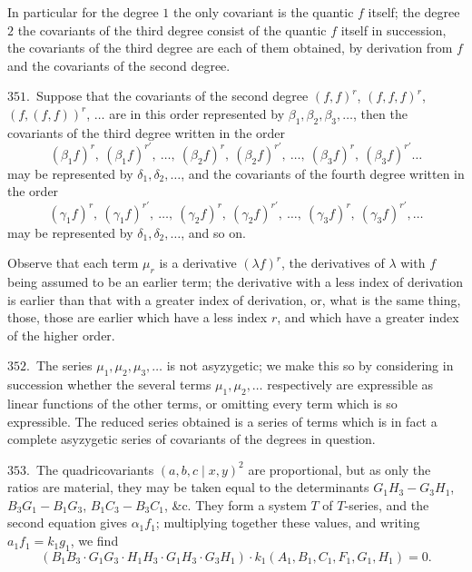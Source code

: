 \documentclass[11pt,a4paper]{article}
\providecommand{\midbar}{\mid}
\begin{document}
In particular for the degree $1$ the only covariant is the quantic $f$
itself; the degree $2$ the covariants of the third degree consist of the
quantic $f$ itself in succession, the covariants of the third degree are
each of them obtained, by derivation from $f$ and the covariants of the
second degree.

\noindent$351$.\ Suppose that the covariants of the second degree
$(f,f)^{r}$, $(f,f,f)^{r}$, $(f,(f,f))^{r}$, $\dotsc$ are
in this order represented by $\beta_{1}, \beta_{2}, \beta_{3}, \dotsc$,
then the covariants of the third degree written in the order
\[
(\beta_{1}f)^{r},\ (\beta_{1}f)^{r'},\ \dotsc,\ (\beta_{2}f)^{r},\
(\beta_{2}f)^{r'},\ \dotsc,\ (\beta_{3}f)^{r},\ (\beta_{3}f)^{r'}\dotsc
\]
may be represented by $\delta_{1},\delta_{2},\dotsc$, and the covariants
of the fourth degree written in the order
\[
(\gamma_{1}f)^{r},\ (\gamma_{1}f)^{r'},\ \dotsc,\ (\gamma_{2}f)^{r},\
(\gamma_{2}f)^{r'},\ \dotsc,\ (\gamma_{3}f)^{r},\ (\gamma_{3}f)^{r'},\dotsc
\]
may be represented by $\delta_{1},\delta_{2},\dotsc$, and so on.

Observe that each term $\mu_{r}$ is a derivative $(\lambda f)^{r}$, the
derivatives of $\lambda$ with $f$ being assumed to be an earlier term;
the derivative with a less index of derivation is earlier than that with
a greater index of derivation, or, what is the same thing, those, those
are earlier which have a less index $r$, and which have a greater index
of the higher order.

\noindent$352$.\ The series $\mu_{1},\mu_{2},\mu_{3},\dotsc$ is not
asyzygetic; we make this so by considering in succession whether the
several terms $\mu_{1},\mu_{2},\dotsc$ respectively are expressible as
linear functions of the other terms, or omitting every term which is so
expressible. The reduced series obtained is a series of terms which is
in fact a complete asyzygetic series of covariants of the degrees in
question.

\noindent$353$.\ The quadricovariants $(a, b, c\!\midbar\! x, y)^{2}$ are
proportional, but as only the ratios are material, they may be taken
equal to the determinants $G_{1}H_{3} - G_{3}H_{1}$, $B_{3}G_{1} - B_{1}G_{3}$,
$B_{1}C_{3} - B_{3}C_{1}$, \&c. They form a system $T$ of $T$-series, and
the second equation gives $\alpha_{1}f_{1}$; multiplying together these
values, and writing $a_{1}f_{1} = k_{1}g_{1}$, we find
\[
(B_{1}B_{3} \cdot G_{1}G_{3} \cdot H_{1}H_{3} \cdot G_{1}H_{3} \cdot G_{3}H_{1})
\cdot k_{1}(A_{1}, B_{1}, C_{1}, F_{1}, G_{1}, H_{1}) = 0.
\]
\end{document}
